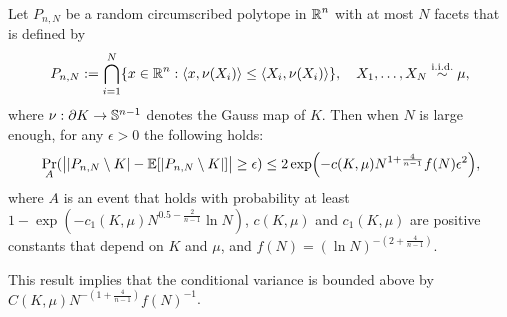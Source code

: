\begin{theorem}{\label{geneThm}}
	Let $ P_{n,N} $ be a random circumscribed polytope in $ \operatorname{\mathbb{R}}^{n} $ with at most $N$ facets that is defined by
	\begin{equation}\label{Eq:def}
	P_{n,N} := \bigcap_{i=1}^{N}\{x\in\operatorname{\mathbb{R}}^n: \langle x, \nu(X_i) \rangle \leq \langle X_i, \nu(X_i) \rangle \}, \quad X_1,\ldots,X_N \stackrel{\text{i.i.d.}}{\sim} \mu,
	\end{equation} where   $ \nu:\partial K \to \mathbb{S}^{n-1} $ denotes the Gauss map of $K$. 
	Then when $ N$  is large enough, for any $ \epsilon > 0 $ the following holds:
	\begin{equation}{\label{maineq}}
	\Pr_A(\big||P_{n,N} \setminus K| - \E[|P_{n,N}\setminus K|]\big| \geq \epsilon) \leq 2\exp\left(-c(K,\mu)N^{1+\frac{4}{n-1}}f(N)\epsilon^2\right),
	\end{equation}
	where $A$ is an event that holds with probability at least $1- \exp\left(-c_1(K,\mu)N^{0.5-\frac{2}{n-1}}\ln N\right)$, $c(K,\mu)$ and $c_1(K,\mu)$ are  positive constants that depend on $K$ and $\mu$, and $ f(N) = (\ln N)^{-(2+\frac{4}{n-1})}$. 
\end{theorem}
This result implies that the conditional variance is bounded above by $C(K,\mu)N^{-(1+\frac{4}{n-1})}f(N)^{-1}$.

